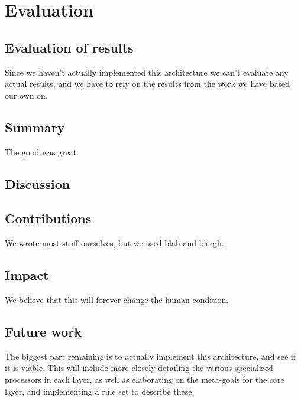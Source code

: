 \chapter{Evaluation}
\section{Evaluation of results}
Since we haven't actually implemented this architecture we can't evaluate any
actual results, and we have to rely on the results from the work we have based
our own on.

\section{Summary}
The good was great.


\section{Discussion}


\section{Contributions}
We wrote most stuff ourselves, but we used blah and blergh.


\section{Impact}
We believe that this will forever change the human condition.


\section{Future work}
The biggest part remaining is to actually implement this architecture, and see
if it is viable. This will include more closely detailing the various
specialized processors in each layer, as well as elaborating on the meta-goals
for the core layer, and implementing a rule set to describe these.